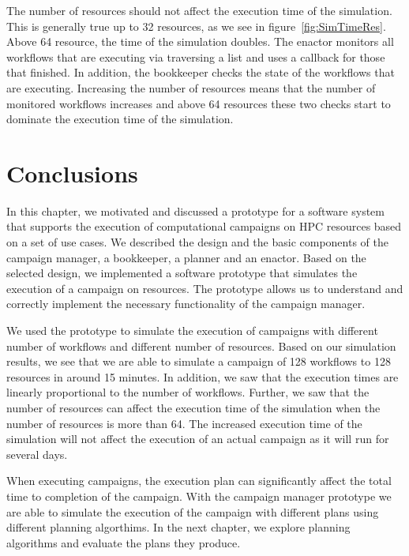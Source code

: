 The number of resources should not affect the execution time of the simulation.
This is generally true up to 32 resources, as we see in figure~\ref{fig:SimTimeRes}.
Above 64 resource, the time of the simulation doubles.
The enactor monitors all workflows that are executing via traversing a list and uses a callback for those that finished.
In addition, the bookkeeper checks the state of the workflows that are executing.
Increasing the number of resources means that the number of monitored workflows increases and above 64 resources these two checks start to dominate the execution time of the simulation.


\section{Conclusions}
\label{sec:cm_concl}
In this chapter, we motivated and discussed a prototype for a software system that supports the execution of computational campaigns on HPC resources based on a set of use cases.
We described the design and the basic components of the campaign manager, a bookkeeper, a planner and an enactor.
Based on the selected design, we implemented a software prototype that simulates the execution of a campaign on resources.
The prototype allows us to understand and correctly implement the necessary functionality of the campaign manager.

We used the prototype to simulate the execution of campaigns with different number of workflows and different number of resources.
Based on our simulation results, we see that we are able to simulate a campaign of 128 workflows to 128 resources in around 15 minutes.
In addition, we saw that the execution times are linearly proportional to the number of workflows.
Further, we saw that the number of resources can affect the execution time of the simulation when the number of resources is more than 64.
The increased execution time of the simulation will not affect the execution of an actual campaign as it will run for several days.

When executing campaigns, the execution plan can significantly affect the total time to completion of the campaign.
With the campaign manager prototype we are able to simulate the execution of the campaign with different plans using different planning algorthims.
In the next chapter, we explore planning algorithms and evaluate the plans they produce.



